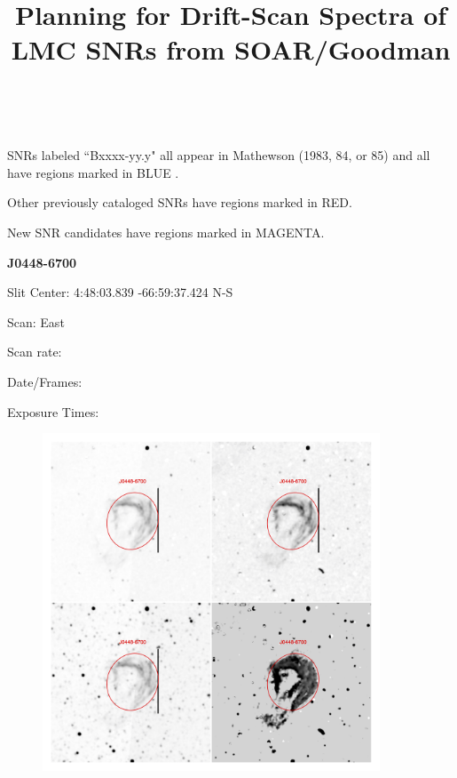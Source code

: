 \documentclass[11pt]{article}
\title{\bf Planning for Drift-Scan Spectra of LMC SNRs from SOAR/Goodman}
\date{}                                           %
\begin{document}
\maketitle
\vspace{1in}

\vspace{3 mm}
\
\vspace{2cm}

\textbullet \quad SNRs labeled ``Bxxxx-yy.y" all appear in Mathewson (1983, 84, or 85) and all have regions marked in BLUE .

\textbullet \quad Other previously cataloged SNRs have regions marked in RED.

\textbullet \quad New SNR candidates have regions marked in MAGENTA.

\newpage
{\bf J0448-6700}

Slit Center:   4:48:03.839        -66:59:37.424      N-S

Scan:  East

Scan rate:  

Date/Frames:

Exposure Times:  

\begin{figure}
\includegraphics[width=10.05cm]{snapshots/J0448-6700.png}
\end{figure}
\end{document}
